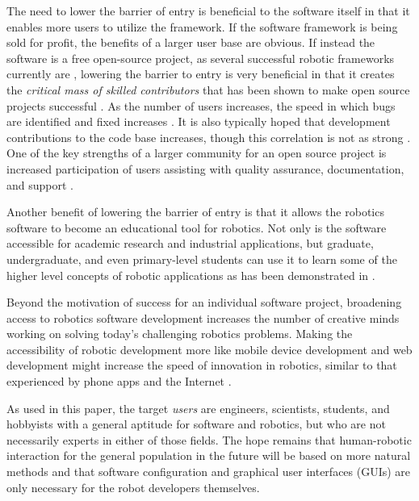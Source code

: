 \documentclass[10pt,journal,compsoc]{joser1}
\begin{document}
{The need to lower the barrier of entry is beneficial to the software itself in that it enables more users to utilize the framework. If the software framework is being sold for profit, the benefits of a larger user base are obvious. If instead the software is a free open-source project, as several successful robotic frameworks currently are \cite{makarenko2007benefits}, lowering the barrier to entry is very beneficial in that it creates the \textit{critical mass of skilled contributors} that has been shown to make open source projects successful \cite{bruyninckx2001open}. As the number of users increases, the speed in which bugs are identified and fixed increases \cite{schmidt1999software}. It is also typically hoped that development contributions to the code base increases, though this correlation is not as strong \cite{schmidt1999software}. One of the key strengths of a larger community for an open source project is increased participation of users assisting with quality assurance, documentation, and support 
\cite{schmidt2001leveraging}.

Another benefit of lowering the barrier of entry is that it allows the robotics software to become an educational tool for robotics. Not only is the software accessible for academic research and industrial applications, but graduate, undergraduate, and even primary-level students can use it to learn some of the higher level concepts of robotic applications as has been demonstrated in \cite{correll2013one, moll2011teaching, guyot2011teaching}. 

Beyond the motivation of success for an individual software project, broadening access to robotics software development increases the number of creative minds working on solving today's challenging robotics problems. Making the accessibility of robotic development more like mobile device development and web development might increase the speed of innovation in robotics, similar to that experienced by phone apps and the Internet \cite{boudreau2012let}.

As used in this paper, the target \textit{users} are engineers, scientists, students, and hobbyists with a general aptitude for software and robotics, but who are not necessarily experts in either of those fields. The hope remains that human-robotic interaction for the general population in the future will be based on more natural methods and that software configuration and graphical user interfaces (GUIs) are only necessary for the robot developers themselves.

}
\end{document}
